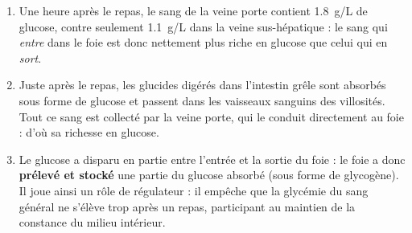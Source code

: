 \documentclass[11pt]{article}
\newcommand{\cle}[1]{{\popxbold\color{popdark}#1}}
\begin{document}
\begin{corrige}
\begin{enumerate}
\item Une heure après le repas, le sang de la \cle{veine porte} contient \SI{1,8}{g/L} de glucose, contre seulement \SI{1,1}{g/L} dans la \cle{veine sus-hépatique} : le sang qui \emph{entre} dans le \cle{foie} est donc nettement plus riche en glucose que celui qui en \emph{sort}.
\item Juste après le repas, les glucides digérés dans l'intestin grêle sont absorbés sous forme de glucose et passent dans les vaisseaux sanguins des villosités. Tout ce sang est collecté par la veine porte, qui le conduit directement au foie : d'où sa richesse en glucose.
\item Le glucose a disparu en partie entre l'entrée et la sortie du foie : le foie a donc \textbf{prélevé et stocké} une partie du glucose absorbé (sous forme de glycogène). Il joue ainsi un rôle de régulateur : il empêche que la glycémie du sang général ne s'élève trop après un repas, participant au maintien de la constance du milieu intérieur.
\end{enumerate}
\end{corrige}
\end{document}
